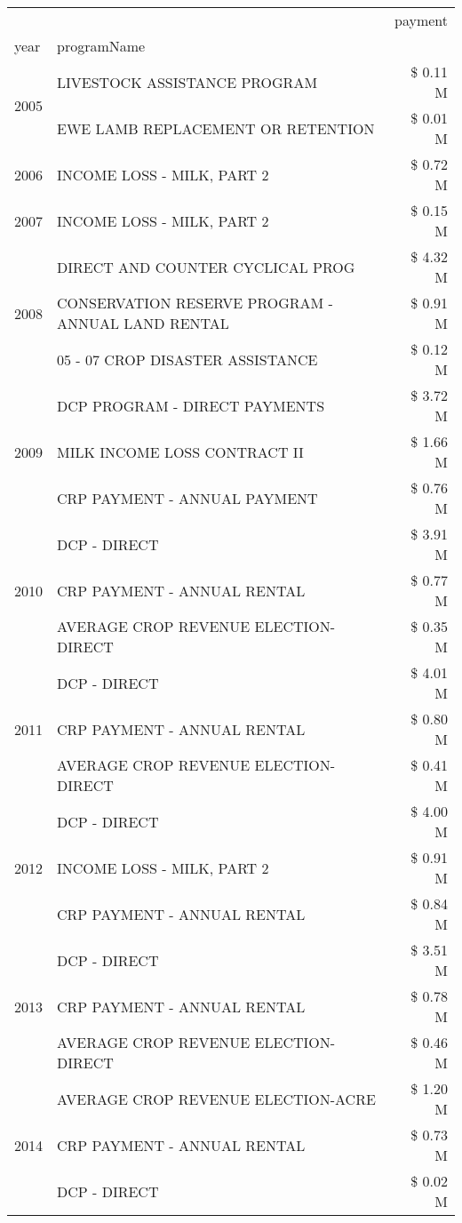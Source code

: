 \begin{tabular}{llr}
\toprule
 &  & payment \\
year & programName &  \\
\midrule
\multirow[t]{2}{*}{2005} & LIVESTOCK ASSISTANCE PROGRAM & \$ 0.11 M \\
 & EWE LAMB REPLACEMENT OR RETENTION & \$ 0.01 M \\
\cline{1-3}
2006 & INCOME LOSS - MILK, PART 2 & \$ 0.72 M \\
\cline{1-3}
2007 & INCOME LOSS - MILK, PART 2 & \$ 0.15 M \\
\cline{1-3}
\multirow[t]{3}{*}{2008} & DIRECT AND COUNTER CYCLICAL PROG & \$ 4.32 M \\
 & CONSERVATION RESERVE PROGRAM - ANNUAL LAND RENTAL & \$ 0.91 M \\
 & 05 - 07 CROP DISASTER ASSISTANCE & \$ 0.12 M \\
\cline{1-3}
\multirow[t]{3}{*}{2009} & DCP PROGRAM - DIRECT PAYMENTS & \$ 3.72 M \\
 & MILK INCOME LOSS CONTRACT II & \$ 1.66 M \\
 & CRP PAYMENT - ANNUAL PAYMENT & \$ 0.76 M \\
\cline{1-3}
\multirow[t]{3}{*}{2010} & DCP - DIRECT & \$ 3.91 M \\
 & CRP PAYMENT - ANNUAL RENTAL & \$ 0.77 M \\
 & AVERAGE CROP REVENUE ELECTION-DIRECT & \$ 0.35 M \\
\cline{1-3}
\multirow[t]{3}{*}{2011} & DCP - DIRECT & \$ 4.01 M \\
 & CRP PAYMENT - ANNUAL RENTAL & \$ 0.80 M \\
 & AVERAGE CROP REVENUE ELECTION-DIRECT & \$ 0.41 M \\
\cline{1-3}
\multirow[t]{3}{*}{2012} & DCP - DIRECT & \$ 4.00 M \\
 & INCOME LOSS - MILK, PART 2 & \$ 0.91 M \\
 & CRP PAYMENT - ANNUAL RENTAL & \$ 0.84 M \\
\cline{1-3}
\multirow[t]{3}{*}{2013} & DCP - DIRECT & \$ 3.51 M \\
 & CRP PAYMENT - ANNUAL RENTAL & \$ 0.78 M \\
 & AVERAGE CROP REVENUE ELECTION-DIRECT & \$ 0.46 M \\
\cline{1-3}
\multirow[t]{3}{*}{2014} & AVERAGE CROP REVENUE ELECTION-ACRE & \$ 1.20 M \\
 & CRP PAYMENT - ANNUAL RENTAL & \$ 0.73 M \\
 & DCP - DIRECT & \$ 0.02 M \\

\end{tabular}
